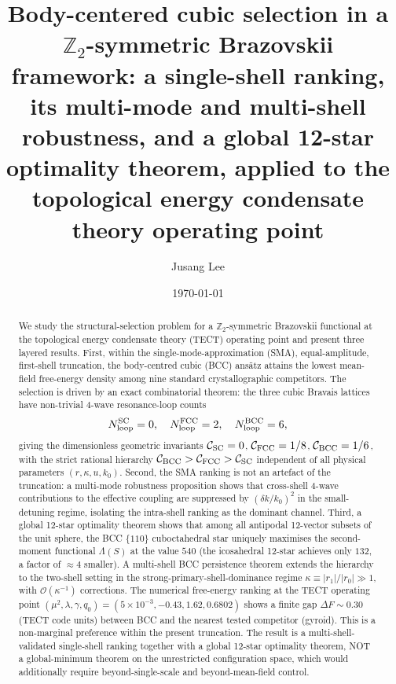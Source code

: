 \title{Body-centered cubic selection in a $\mathbb{Z}_2$-symmetric
Brazovskii framework: a single-shell ranking, its multi-mode and
multi-shell robustness, and a global 12-star optimality theorem,
applied to the topological energy condensate theory operating point}

\author{Jusang Lee}

\date{\today}

\begin{abstract}
We study the structural-selection problem for a $\mathbb{Z}_2$-symmetric
Brazovskii functional at the topological energy condensate theory
(TECT) operating point and present three layered results.
First, within the single-mode-approximation (SMA), equal-amplitude,
first-shell truncation, the body-centred cubic (BCC) ans\"atz attains
the lowest mean-field free-energy density among nine standard
crystallographic competitors. The selection is driven by an exact
combinatorial theorem: the three cubic Bravais lattices have
non-trivial 4-wave resonance-loop counts
\[
N_{\rm loop}^{\rm SC} = 0,\quad
N_{\rm loop}^{\rm FCC} = 2,\quad
N_{\rm loop}^{\rm BCC} = 6,
\]
giving the dimensionless geometric invariants
$\mathcal{C}_{\rm SC} = 0$, $\mathcal{C}_{\rm FCC} = 1/8$,
$\mathcal{C}_{\rm BCC} = 1/6$, with the strict rational hierarchy
$\mathcal{C}_{\rm BCC} > \mathcal{C}_{\rm FCC} > \mathcal{C}_{\rm SC}$
independent of all physical parameters $(r,\kappa,u,k_0)$.
Second, the SMA ranking is not an artefact of the truncation: a
multi-mode robustness proposition shows that cross-shell 4-wave
contributions to the effective coupling are suppressed by
$(\delta k / k_0)^2$ in the small-detuning regime, isolating the
intra-shell ranking as the dominant channel.
Third, a global 12-star optimality theorem shows that among all
antipodal 12-vector subsets of the unit sphere, the BCC $\{110\}$
cuboctahedral star uniquely maximises the second-moment functional
$\Lambda(S)$ at the value $540$ (the icosahedral 12-star achieves only
$132$, a factor of $\approx 4$ smaller). A multi-shell BCC persistence
theorem extends the hierarchy to the two-shell setting in the
strong-primary-shell-dominance regime
$\kappa \equiv |r_1|/|r_0| \gg 1$, with $\mathcal{O}(\kappa^{-1})$
corrections.
The numerical free-energy ranking at the TECT operating point
$(\mu^2,\lambda,\gamma,q_0) = (5\times 10^{-3}, -0.43, 1.62, 0.6802)$
shows a finite gap $\Delta F \sim 0.30$ (TECT code units) between BCC
and the nearest tested competitor (gyroid). This is a non-marginal
preference within the present truncation. The result is a
multi-shell-validated single-shell ranking together with a global
12-star optimality theorem, NOT a global-minimum theorem on the
unrestricted configuration space, which would additionally require
beyond-single-scale and beyond-mean-field control.
\end{abstract}

